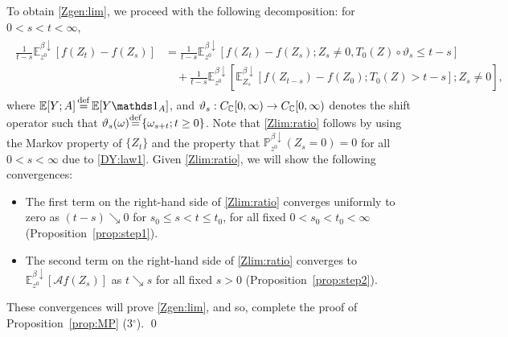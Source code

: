 \documentclass[12pt, twoside]{article}
\numberwithin{figure}{section}
\newcommand{\1}{\mathds 1}
\newcommand{\da}{{\downarrow}}
\newcommand{\ms}{\mathscr}
\renewcommand{\P}{{\mathbb P}}
\newcommand{\E}{{\mathbb E}}
\newcommand{\2}{{\mathbf 1}}
\newcommand{\defeq}{{\stackrel{\rm def}{=}}}
\newcommand{\cc}{{^\circ}}
\begin{document}
To obtain \eqref{Zgen:lim}, we proceed with the following decomposition: for $0<s<t<\infty$, 
\begin{align}\label{Zlim:ratio}
\begin{split}
\frac{1}{t-s}\E^{\beta\da}_{z^0}[f(Z_{t})-f(Z_s)]&=\frac{1}{t-s}\E^{\beta\da}_{z^0}[f(Z_{t})-f(Z_s);Z_s\neq 0,T_0(Z)\circ \vartheta_s\leq t-s]\\
&\quad +\frac{1}{t-s}\E^{\beta\da}_{z^0}[\E^{\beta\da}_{Z_s}[f(Z_{t-s})-f(Z_0);T_0(Z)> t-s];Z_s\neq 0],
\end{split}
\end{align}
where $\E[Y;A]\,\defeq\,\E[Y\1_A]$, and
$\vartheta_s:C_{\Bbb C}[0,\infty)\to C_{\Bbb C}[0,\infty)$ denotes the shift operator such that $\vartheta_s(\omega)\defeq \{\omega_{s+t};t\geq 0\}$. Note that \eqref{Zlim:ratio} follows by using  the Markov property of $\{Z_t\}$ and the property that $\P^{\beta\da}_{z^0}(Z_s= 0)=0$ for all $0<s<\infty$ due to \eqref{DY:law1}. Given \eqref{Zlim:ratio}, we will show the following convergences:
\begin{itemize}
\item [\rm (1)]  The first term on the right-hand side of \eqref{Zlim:ratio} converges uniformly to zero as $(t-s) \searrow 0$ for $s_0\leq s< t\leq t_0$, for all fixed $0<s_0<t_0<\infty$ (Proposition~\ref{prop:step1}).
\item [\rm (2)] The second term on the right-hand side of \eqref{Zlim:ratio} converges to $\E^{\beta\da}_{z^0}[\ms Af(Z_s)]$ as $t\searrow s$ for all fixed $s>0$ (Proposition~\ref{prop:step2}).
\end{itemize}
These convergences will prove \eqref{Zgen:lim}, and so, complete the proof of Proposition~\ref{prop:MP} (3$\cc$). \qed \smallskip 
\end{document}
